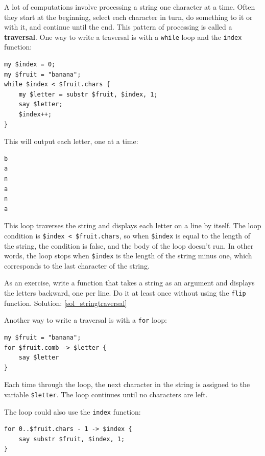A lot of computations involve processing a string one 
character at a time.  Often they start at the beginning, 
select each character in turn, do something to it or with 
it, and continue until the end.  This pattern of
processing is called a {\bf traversal}.  One way to write
a traversal is with a {\tt while} loop and the 
{\tt index} function:

\begin{verbatim}
my $index = 0;
my $fruit = "banana";
while $index < $fruit.chars { 
    my $letter = substr $fruit, $index, 1; 
    say $letter; 
    $index++;
}
\end{verbatim}
%

This will output each letter, one at a time:
\begin{verbatim}
b
a
n
a
n
a
\end{verbatim}
%
This loop traverses the string and displays each letter on 
a line by itself.  The loop condition is 
{\tt \$index < \$fruit.chars}, so when {\tt \$index} is equal 
to the length of the string, the condition is false, and 
the body of the loop doesn't run. In other words, the loop 
stops when {\tt \$index} is the length of the string minus 
one, which corresponds to the last character of the string.

As an exercise, write a function that takes a string as 
an argument and displays the letters backward, one 
per line. Do it at least once without using the 
{\tt flip} function. Solution: \ref{sol_stringtraversal}

Another way to write a traversal is with a {\tt for} loop:

\begin{verbatim}
my $fruit = "banana";
for $fruit.comb -> $letter {
    say $letter
}
\end{verbatim}
%

Each time through the loop, the next character in the string 
is assigned to the variable {\tt \$letter}.  The loop 
continues until no characters are left.

The loop could also use the {\tt index} function:

\begin{verbatim}
for 0..$fruit.chars - 1 -> $index {
    say substr $fruit, $index, 1;
}
\end{verbatim}
%


